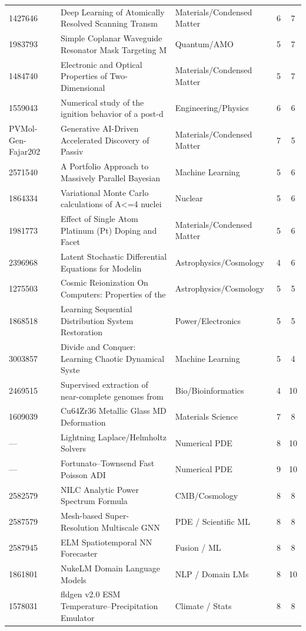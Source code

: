 \begin{longtable}{lllcc}
1427646 & Deep Learning of Atomically Resolved Scanning Transm & Materials/Condensed Matter & 6 & 7 \\
1983793 & Simple Coplanar Waveguide Resonator Mask Targeting M & Quantum/AMO & 5 & 7 \\
1484740 & Electronic and Optical Properties of Two-Dimensional & Materials/Condensed Matter & 5 & 7 \\
1559043 & Numerical study of the ignition behavior of a post-d & Engineering/Physics & 6 & 6 \\
PVMol-Gen-Fajar202 & Generative AI-Driven Accelerated Discovery of Passiv & Materials/Condensed Matter & 7 & 5 \\
2571540 & A Portfolio Approach to Massively Parallel Bayesian  & Machine Learning & 5 & 6 \\
1864334 & Variational Monte Carlo calculations of A\textless{}=4 nuclei  & Nuclear & 5 & 6 \\
1981773 & Effect of Single Atom Platinum (Pt) Doping and Facet & Materials/Condensed Matter & 5 & 6 \\
2396968 & Latent Stochastic Differential Equations for Modelin & Astrophysics/Cosmology & 4 & 6 \\
1275503 & Cosmic Reionization On Computers: Properties of the  & Astrophysics/Cosmology & 5 & 5 \\
1868518 & Learning Sequential Distribution System Restoration  & Power/Electronics & 5 & 5 \\
3003857 & Divide and Conquer: Learning Chaotic Dynamical Syste & Machine Learning & 5 & 4 \\
2469515 & Supervised extraction of near-complete genomes from  & Bio/Bioinformatics & 4 & 10 \\
1609039 & Cu64Zr36 Metallic Glass MD Deformation & Materials Science & 7 & 8 \\
— & Lightning Laplace/Helmholtz Solvers & Numerical PDE & 8 & 10 \\
— & Fortunato--Townsend Fast Poisson ADI & Numerical PDE & 9 & 10 \\
2582579 & NILC Analytic Power Spectrum Formula & CMB/Cosmology & 8 & 8 \\
2587579 & Mesh-based Super-Resolution Multiscale GNN & PDE / Scientific ML & 8 & 8 \\
2587945 & ELM Spatiotemporal NN Forecaster & Fusion / ML & 8 & 8 \\
1861801 & NukeLM Domain Language Models & NLP / Domain LMs & 8 & 10 \\
1578031 & fldgen v2.0 ESM Temperature--Precipitation Emulator & Climate / Stats & 8 & 8 \\

\end{longtable}
